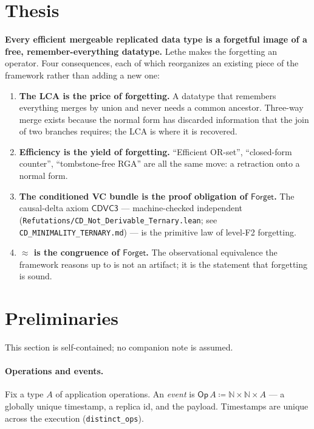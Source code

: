 \documentclass[11pt]{article}
\newcommand{\cd}{\mathsf{CDVC3}}
\newcommand{\lean}[1]{\texttt{#1}}
\newcommand{\eqobs}{\approx}
\newcommand{\Forget}{\mathsf{Forget}}
\newcommand{\Op}{\mathsf{Op}}
\begin{document}
\tableofcontents

\section{Thesis}\label{sec:thesis}

\textbf{Every efficient mergeable replicated data type is a forgetful
image of a free, remember-everything datatype.} Lethe makes the forgetting
an operator. Four consequences, each of which reorganizes an existing
piece of the framework rather than adding a new one:

\begin{enumerate}[leftmargin=2em]
\item \textbf{The LCA is the price of forgetting.} A datatype that
  remembers everything merges by union and never needs a common ancestor.
  Three-way merge exists because the normal form has discarded information
  that the join of two branches requires; the LCA is where it is
  recovered.
\item \textbf{Efficiency is the yield of forgetting.} ``Efficient
  OR-set'', ``closed-form counter'', ``tombstone-free RGA'' are all the
  same move: a retraction onto a normal form.
\item \textbf{The conditioned VC bundle is the proof obligation of
  $\Forget$.} The causal-delta axiom $\cd$ --- machine-checked independent
  (\lean{Refutations/CD\_Not\_Derivable\_Ternary.lean}; see
  \lean{CD\_MINIMALITY\_TERNARY.md}) --- is the primitive law of level-F2
  forgetting.
\item \textbf{$\eqobs$ is the congruence of $\Forget$.} The observational
  equivalence the framework reasons up to is not an artifact; it is the
  statement that forgetting is sound.
\end{enumerate}

\section{Preliminaries}\label{sec:prelim}

This section is self-contained; no companion note is assumed.

\paragraph{Operations and events.} Fix a type $A$ of application
operations. An \emph{event} is $\Op\,A \coloneqq \mathbb{N} \times
\mathbb{N} \times A$ --- a globally unique timestamp, a replica id, and
the payload. Timestamps are unique across the execution
(\lean{distinct\_ops}).
\end{document}
